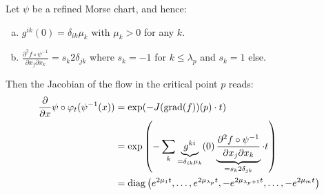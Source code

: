 \begin{remark}\label{rem: jacobian of the flow in refined Morse chart}
	Let $\psi$ be a refined Morse chart, and hence:
	\begin{enumerate}[(a)]
		\item $g^{ik}(0)=\delta_{ik}\mu_k$ with $\mu_k>0$ for any $k$.
		\item $\frac{\partial ^2 f\circ \psi^{-1}}{\partial x_j\partial x_k}=s_k2\delta_{jk}$ where $s_k=-1$ for $k\leq \lambda_p$ and $s_k=1$ else.
	\end{enumerate}  Then the Jacobian of the flow in the critical point $p$ reads:
	\begin{align*}
	\frac{\partial}{\partial x} \psi \circ \varphi_t(\psi^{-1}(x))
	&=\exp(-J(\mathrm{grad}(f))(p)\cdot t)\\
	&=\exp \left(-\sum_k \underbrace{g^{ki}}_{=\delta_{ik}\mu_k}(0) \underbrace{\frac{\partial ^2 f\circ \psi^{-1}}{\partial x_j\partial x_k}}_{=s_k2\delta_{jk}}\cdot t\right) \\
	&=\mathrm{diag}\left(e^{2\mu_1 t},\dots,e^{2\mu_{\lambda_p} t},-e^{2\mu_{\lambda_p+1} t},\dots ,-e^{2\mu_m t} \right)
	\end{align*}
\end{remark}


